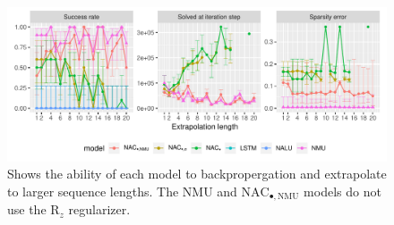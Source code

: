 \begin{figure}[h]
\centering
\includegraphics[width=\linewidth,trim={0 0.5cm 0 0},clip]{results/sequential_mnist_prod_long_ablation.pdf}
\caption{Shows the ability of each model to backpropergation and extrapolate to larger sequence lengths. The NMU and $\mathrm{NAC}_{\bullet,\mathrm{NMU}}$ models do not use the $\mathrm{R}_z$ regularizer.} 
\label{fig:sequential-mnist-prod-ablation}
\end{figure}
